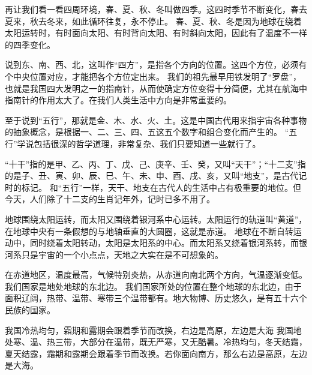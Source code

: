 \documentclass[avery5371,grid]{flashcards}
\begin{document}
{再让我们看一看四周环境，春、夏、秋、冬叫做四季。这四时季节不断变化，春去夏来，秋去冬来，如此循环往复，永不停止。} %
{春、夏、秋、冬是因为地球在绕着太阳运转时，有时面向太阳、有时背向太阳、有时斜向太阳，因此有了温度不一样的四季变化。} %

{说到东、南、西、北，这叫作“四方”，是指各个方向的位置。这四个方位，必须有个中央位置对应，才能把各个方位定出来。} %
{我们的祖先最早用铁发明了“罗盘”，也就是我国四大发明之一的指南针，从而使确定方位变得十分简便，尤其在航海中指南针的作用太大了。在我们人类生活中方向是非常重要的。} %

{至于说到“五行”，那就是金、木、水、火、土。这是中国古代用来指宇宙各种事物的抽象概念，是根据一、二、三、四、五这五个数字和组合变化而产生的。} %
{“五行”学说包括很深的哲学道理，非常复杂、我们只要知道一些就行了。} %


{“十干”指的是甲、乙、丙、丁、戊、己、庚辛、壬、癸，又叫“天干”；“十二支”指的是子、丑、寅、卯、辰、巳、午、未、申、酉、戌、亥，又叫“地支”，是古代记时的标记。} %
{和“五行”一样，天干、地支在古代人的生活中占有极重要的地位。但今天，人们除了十二支的生肖记年外，记时已多不用了。} %

{地球围绕太阳运转，而太阳又围绕着银河系中心运转。太阳运行的轨道叫“黄道”，在地球中央有一条假想的与地轴垂直的大圆圈，这就是赤道。} %
{地球在不断自转运动中，同时绕着太阳转动，太阳是太阳系的中心。而太阳系又绕着银河系转，而银河系只是宇宙的一个小点点，天地之大实在是不可想象的。} %

{在赤道地区，温度最高，气候特别炎热，从赤道向南北两个方向，气温逐渐变低。我们国家是地处地球的东北边。} %
{我们国家所处的位置在整个地球的东北边，由于面积辽阔，热带、温带、寒带三个温带都有。地大物博、历史悠久，是有五十六个民族的国家。} %

{我国冷热均匀，霜期和露期会跟着季节而改换，右边是高原，左边是大海} %
{我国地处寒、温、热三带，大部分在温带，既无严寒，又无酷暑。冷热均匀，冬天结霜，夏天结露，霜期和露期会跟着季节而改换。若你面向南方，那么右边是高原，左边是大海。} %
\end{document}

